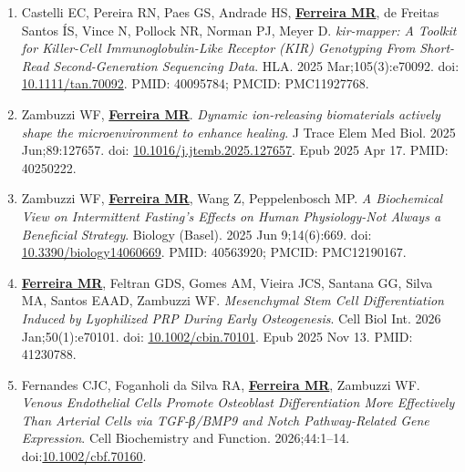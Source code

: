 \documentclass[
  letterpaper,
  DIV=11,
  numbers=noendperiod]{scrartcl}
\begin{document}
\begin{enumerate}
\item
  Castelli EC, Pereira RN, Paes GS, Andrade HS, \ul{\textbf{Ferreira
  MR}}, de Freitas Santos ÍS, Vince N, Pollock NR, Norman PJ, Meyer D.
  \emph{kir-mapper: A Toolkit for Killer-Cell Immunoglobulin-Like
  Receptor (KIR) Genotyping From Short-Read Second-Generation Sequencing
  Data}. HLA. 2025 Mar;105(3):e70092. doi:
  \href{https://www.doi.org/}{10.1111/tan.70092}. PMID: 40095784; PMCID:
  PMC11927768.
\item
  Zambuzzi WF, \ul{\textbf{Ferreira MR}}. \emph{Dynamic ion-releasing
  biomaterials actively shape the microenvironment to enhance healing}.
  J Trace Elem Med Biol. 2025 Jun;89:127657. doi:
  \href{https://www.doi.org/10.1016/j.jtemb.2025.127657}{10.1016/j.jtemb.2025.127657}.
  Epub 2025 Apr 17. PMID: 40250222.
\item
  Zambuzzi WF, \ul{\textbf{Ferreira MR}}, Wang Z, Peppelenbosch MP.
  \emph{A Biochemical View on Intermittent Fasting's Effects on Human
  Physiology-Not Always a Beneficial Strategy}. Biology (Basel). 2025
  Jun 9;14(6):669. doi:
  \href{https://www.doi.org/10.3390/biology14060669}{10.3390/biology14060669}.
  PMID: 40563920; PMCID: PMC12190167.
\item
  \ul{\textbf{Ferreira MR}}, Feltran GDS, Gomes AM, Vieira JCS, Santana
  GG, Silva MA, Santos EAAD, Zambuzzi WF. \emph{Mesenchymal Stem Cell
  Differentiation Induced by Lyophilized PRP During Early Osteogenesis}.
  Cell Biol Int. 2026 Jan;50(1):e70101. doi:
  \href{https://www.doi.org/10.1002/cbin.70101}{10.1002/cbin.70101}.
  Epub 2025 Nov 13. PMID: 41230788.
\item
  Fernandes CJC, Foganholi da Silva RA, \ul{\textbf{Ferreira MR}},
  Zambuzzi WF. \emph{Venous Endothelial Cells Promote Osteoblast
  Differentiation More Effectively Than Arterial Cells via TGF-β/BMP9
  and Notch Pathway-Related Gene Expression}. Cell Biochemistry and
  Function. 2026;44:1--14.
  doi:\href{https://analyticalsciencejournals.onlinelibrary.wiley.com/doi/full/10.1002/cbf.70160}{10.1002/cbf.70160}.\\
\end{enumerate}
\end{document}
